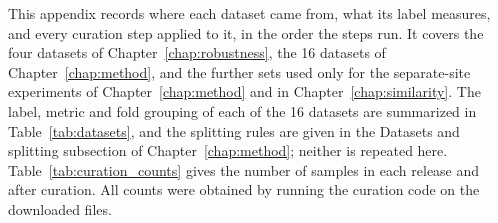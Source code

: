 This appendix records where each dataset came from, what its label measures, and every curation step applied to it, in the order the steps run. It covers the four datasets of Chapter~\ref{chap:robustness}, the 16 datasets of Chapter~\ref{chap:method}, and the further sets used only for the separate-site experiments of Chapter~\ref{chap:method} and in Chapter~\ref{chap:similarity}. The label, metric and fold grouping of each of the 16 datasets are summarized in Table~\ref{tab:datasets}, and the splitting rules are given in the Datasets and splitting subsection of Chapter~\ref{chap:method}; neither is repeated here. Table~\ref{tab:curation_counts} gives the number of samples in each release and after curation. All counts were obtained by running the curation code on the downloaded files.

